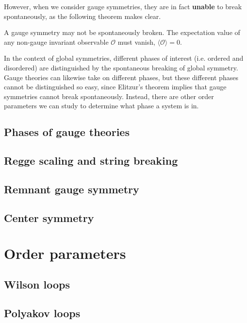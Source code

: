 However, when we consider gauge symmetries, they are in fact \textbf{unable} to break spontaneously, as the following theorem makes clear. 
\begin{theorem}[Elitzur]
	A gauge symmetry may not be spontaneously broken. The expectation value of any non-gauge invariant observable $\mathcal O$ must vanish, $\langle\mathcal O\rangle = 0$. 
\end{theorem}
In the context of global symmetries, different phases of interest (i.e. ordered and disordered) are distinguished by the spontaneous breaking of global symmetry. Gauge theories can likewise take on different phases, but these different phases cannot be distinguished so easy, since Elitzur's theorem implies that gauge symmetries cannot break spontaneously. Instead, there are other order parameters we can study to determine what phase a system is in. 

\subsection{Phases of gauge theories}

\subsection{Regge scaling and string breaking}

\subsection{Remnant gauge symmetry}

\subsection{Center symmetry}

\begin{interlude}

\end{interlude}

\newpage
\section{Order parameters}

\subsection{Wilson loops}

\subsection{Polyakov loops}

